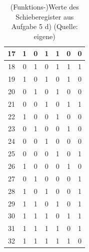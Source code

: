 \begin{table}[h!]
\begin{tabular}{|c|c|c|c|c|c|c|}
        \hline
        17 &  1 & 0 & 1 & 1 & 0 & 0 \\
        \hline
        18 &  0 & 1 & 0 & 1 & 1 & 1 \\
        \hline
        19 &  1 & 0 & 1 & 0 & 1 & 0 \\
        \hline
        20 &  0 & 1 & 0 & 1 & 0 & 0 \\
        \hline
        21 &  0 & 0 & 1 & 0 & 1 & 1 \\
        \hline
        22 &  1 & 0 & 0 & 1 & 0 & 0  \\
        \hline
        23 &  0 & 1 & 0 & 0 & 1 & 0  \\
        \hline
        24 &  0 &  0 & 1 & 0 & 0 & 0  \\
        \hline
        25 &  0 &  0 &  0 & 1 & 0 & 1  \\
        \hline
        26 &  1 & 0 &  0 &  0 & 1 & 0 \\
        \hline
        27 &  0 & 1 & 0 &  0 &  0 & 1 \\
        \hline
        28 &  1 & 0 & 1 & 0 &  0 &  1  \\
        \hline
        29 &  1 &  1 & 0 & 1 & 0 &  1  \\
        \hline
        30 &  1 & 1 &  1 & 0 & 1 & 1 \\
        \hline
        31 &  1 & 1 & 1 &  1 & 0 & 1  \\
        \hline
        32 &  1 & 1 & 1 & 1 &  1 & 0 \\
        \hline
    \end{tabular}
    \caption{(Funktions-)Werte des Schieberegister aus Aufgabe 5 d) (Quelle: eigene)}
    \label{tab:schieberegister}
\end{table}